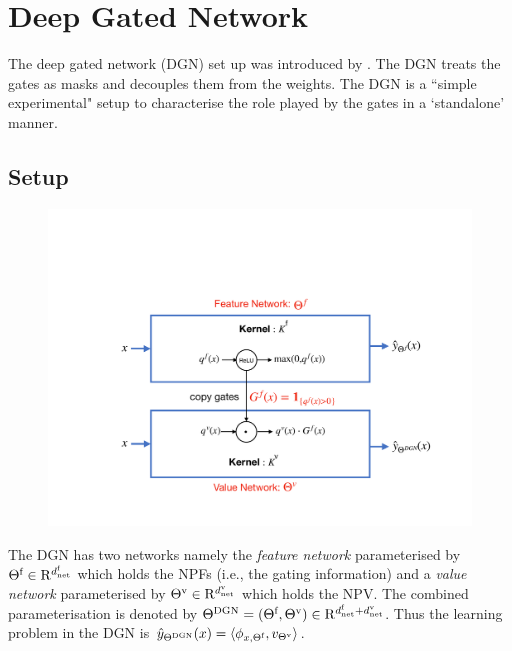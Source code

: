 \section{Deep Gated Network }
The deep gated network (DGN) set up was introduced by \cite{npk}. The DGN treats the gates as masks and decouples them from the weights. The DGN is a ``simple experimental" setup to characterise the role played by the gates in a `standalone' manner.  
\subsection{Setup}
\FloatBarrier
\begin{figure}[H]
\begin{center}
\includegraphics[scale=0.3]{figs/dgn.pdf}
\end{center}
\end{figure}
The DGN has two networks namely the \emph{feature network} parameterised by $\Theta^{\textrm{f}}\in\mathrm{R}^{d^{\text{f}}_{\text{net}}}$ which holds the NPFs (i.e., the gating information) and a \emph{value network} parameterised by ${\Theta}^{\text{v}}\in\mathrm{R}^{d^{\text{v}}_{\text{net}}}$ which holds the NPV.  The combined parameterisation is denoted by $\Theta^{\text{DGN}}=(\Theta^{\textrm{f}},{\Theta}^{\text{v}})\in \mathrm{R}^{d^{\text{f}}_{\text{net}}+d^{\text{v}}_{\text{net}}}$.  Thus the learning problem in the DGN is $\hat{y}_{\Theta^{\text{DGN}}}(x)=\langle \phi_{x,\Theta^{\textrm{f}}},v_{{\Theta}^{\text{v}}}\rangle$. 

